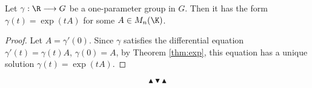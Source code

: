 \begin{theorem}
  Let \(\gamma:\R\longrightarrow G\) be a one-parameter group in \(G\). Then it has the
  form \(\gamma(t)=\exp(tA)\) for some \(A\in M_n(\K)\).
\end{theorem}

\begin{proof}
  Let \(A=\gamma'(0)\). Since \(\gamma\) satisfies the differential equation \(\gamma'(t)=\gamma(t)A\),
  \(\gamma(0)=A\), by Theorem \ref{thm:exp}, this equation has a unique
  solution \(\gamma(t)=\exp(tA)\).
\end{proof}

\[ \blacktriangle \blacktriangledown \blacktriangle \]
